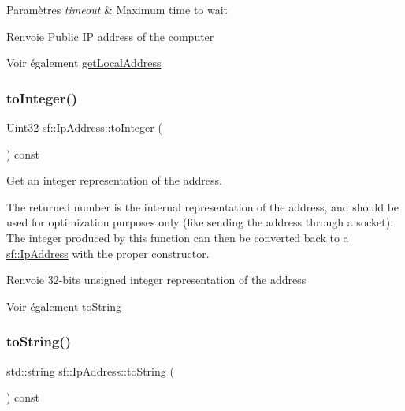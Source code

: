 \begin{DoxyParams}{Paramètres}
{\em timeout} & Maximum time to wait\\
\hline
\end{DoxyParams}
\begin{DoxyReturn}{Renvoie}
Public IP address of the computer
\end{DoxyReturn}
\begin{DoxySeeAlso}{Voir également}
\hyperlink{classsf_1_1IpAddress_a4c31622ad87edca48adbb8e8ed00ee4a}{get\+Local\+Address} 
\end{DoxySeeAlso}
\mbox{\label{classsf_1_1IpAddress_ae7911c5ea9562f9602c3e29cd54b15e9}} 
\subsubsection{\texorpdfstring{to\+Integer()}{toInteger()}}
{\footnotesize\ttfamily Uint32 sf\+::\+Ip\+Address\+::to\+Integer (\begin{DoxyParamCaption}{ }\end{DoxyParamCaption}) const}



Get an integer representation of the address. 

The returned number is the internal representation of the address, and should be used for optimization purposes only (like sending the address through a socket). The integer produced by this function can then be converted back to a \hyperlink{classsf_1_1IpAddress}{sf\+::\+Ip\+Address} with the proper constructor.

\begin{DoxyReturn}{Renvoie}
32-\/bits unsigned integer representation of the address
\end{DoxyReturn}
\begin{DoxySeeAlso}{Voir également}
\hyperlink{classsf_1_1IpAddress_a88507954142d7fc2176cce7f36422340}{to\+String} 
\end{DoxySeeAlso}
\mbox{\label{classsf_1_1IpAddress_a88507954142d7fc2176cce7f36422340}} 
\subsubsection{\texorpdfstring{to\+String()}{toString()}}
{\footnotesize\ttfamily std\+::string sf\+::\+Ip\+Address\+::to\+String (\begin{DoxyParamCaption}{ }\end{DoxyParamCaption}) const}



